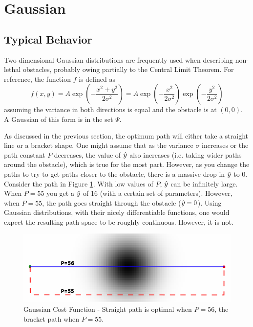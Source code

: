 \section{Gaussian}

\subsection{Typical Behavior}
Two dimensional Gaussian distributions are frequently used when describing non-lethal obstacles, probably owing partially to the Central Limit Theorem\cite{rosenblatt1956}. For reference, the function $f$ is defined as 
\[ f(x,y) = A \exp\left(- \frac{x^2+y^2}{2\sigma^2} \right) = A\exp\left(-\frac{x^2}{2\sigma^2}\right)\exp\left(-\frac{y^2}{2\sigma^2}\right) \]
assuming the variance in both directions is equal and the obstacle is at $(0,0)$. A Gaussian of this form is in the set $\Psi$. 

As discussed in the previous section, the optimum path will either take a straight line or a bracket shape. One might assume that as the variance $\sigma$ increases or the path constant $P$ decreases, the value of $\hat{y}$ also increases (i.e. taking wider paths around the obstacle), which is true for the most part. However, as you change the paths to try to get paths closer to the obstacle, there is a massive drop in $\hat{y}$ to $0$. Consider the path in Figure \ref{fig:gaussian}. With low values of $P$, $\hat{y}$ can be infinitely large. When $P=55$ you get a $\hat{y}$ of 16 (with a certain set of parameters). However, when $P=55$, the path goes straight through the obstacle ($\hat{y}=0$). Using Gaussian distributions, with their nicely differentiable functions, one would expect the resulting path space to be roughly continuous. However, it is not. 

\begin{figure}
\includegraphics[width=\columnwidth]{graphix/Gaussian.png}
\caption{Gaussian Cost Function - Straight path is optimal when $P=56$, the bracket path when $P=55$. }
\label{fig:gaussian}
\end{figure}

